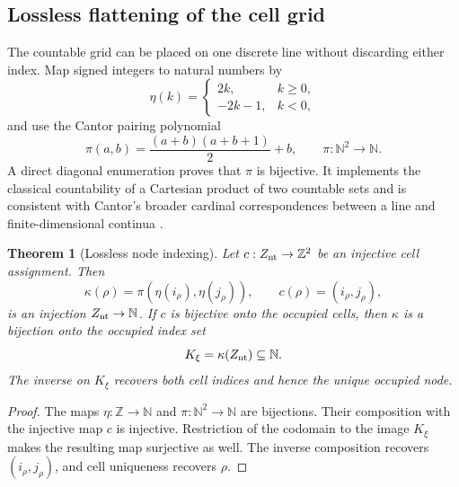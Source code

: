 \documentclass[11pt]{amsart}
\newtheorem{theorem}{Theorem}[section]
\theoremstyle{definition}
\theoremstyle{remark}
\begin{document}
\subsection{Lossless flattening of the cell grid}
The countable grid can be placed on one discrete line without discarding either index.  Map
signed integers to natural numbers by
\begin{equation}\label{eq:signed-natural-map}
 \eta(k)=
 \begin{cases}
  2k,&k\ge0,\\
  -2k-1,&k<0,
 \end{cases}
\end{equation}
and use the Cantor pairing polynomial
\begin{equation}\label{eq:cantor-pairing}
 \pi(a,b)=\frac{(a+b)(a+b+1)}2+b,
 \qquad \pi:\mathbb N^2\longrightarrow\mathbb N.
\end{equation}
A direct diagonal enumeration proves that $\pi$ is bijective.  It implements the classical
countability of a Cartesian product of two countable sets and is consistent with Cantor's
broader cardinal correspondences between a line and finite-dimensional continua
\cite{Cantor1878}.

\begin{theorem}[Lossless node indexing]\label{thm:cantor-node-indexing}
Let $c:Z_{\rm nt}\to\mathbb Z^2$ be an injective cell assignment.  Then
\begin{equation}\label{eq:kappa-node-index}
 \kappa(\rho)=\pi\!\left(\eta(i_\rho),\eta(j_\rho)\right),
 \qquad c(\rho)=(i_\rho,j_\rho),
\end{equation}
is an injection $Z_{\rm nt}\to\mathbb N$.  If $c$ is bijective onto the occupied cells, then
$\kappa$ is a bijection onto the occupied index set
\begin{equation}\label{eq:occupied-index-set}
 K_\xi=\kappa(Z_{\rm nt})\subseteq\mathbb N.
\end{equation}
The inverse on $K_\xi$ recovers both cell indices and hence the unique occupied node.
\end{theorem}

\begin{proof}
The maps $\eta:\mathbb Z\to\mathbb N$ and $\pi:\mathbb N^2\to\mathbb N$ are bijections.
Their composition with the injective map $c$ is injective.  Restriction of the codomain to the
image $K_\xi$ makes the resulting map surjective as well.  The inverse composition recovers
$(i_\rho,j_\rho)$, and cell uniqueness recovers $\rho$.
\end{proof}
\end{document}
